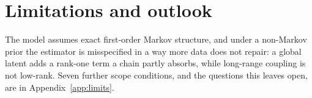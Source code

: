 \documentclass{article}
\theoremstyle{definition}
\theoremstyle{plain}
\begin{document}
\noindent

\section{Limitations and outlook}
\label{sec:limits}

The model assumes exact first-order Markov structure, and under a non-Markov prior the estimator
is misspecified in a way more data does not repair: a global latent adds a rank-one term a chain
partly absorbs, while long-range coupling is not low-rank. Seven further scope conditions, and
the questions this leaves open, are in Appendix~\ref{app:limits}.


\label{LastMainPage}



\clearpage
\appendix

\end{document}
